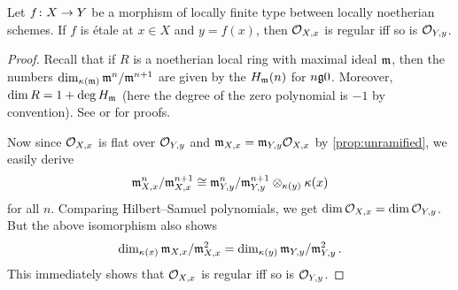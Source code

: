 \begin{prop}\label{prop:etaleRegular}
	Let $f\colon X\morphism Y$ be a morphism of locally finite type between locally noetherian schemes. If $f$ is étale at $x\in X$ and $y=f(x)$, then $\mathcal{O}_{X,x}$ is regular iff so is $\mathcal{O}_{Y,y}$.
\end{prop}
\begin{proof}
	Recall that if $R$ is a noetherian local ring with maximal ideal $\mathfrak{m}$, then the numbers $\dim_{\kappa(\mathfrak{m})}\mathfrak{m}^n/\mathfrak{m}^{n+1}$ are given by the  $H_{\mathfrak{m}}(n)$ for $n\gge 0$. Moreover, $\dim R=1+\deg H_{\mathfrak{m}}$ (here the degree of the zero polynomial is $-1$ by convention). See \cite[Chapter~12]{eisenbudCommAlg} or \cite[Theorem~20]{alg2} for proofs.
	
	Now since $\mathcal{O}_{X,x}$ is flat over $\mathcal{O}_{Y,y}$ and $\mathfrak{m}_{X,x}=\mathfrak{m}_{Y,y}\mathcal{O}_{X,x}$ by \cref{prop:unramified}, we easily derive
	\begin{equation*}
		\mathfrak{m}_{X,x}^n/\mathfrak{m}_{X,x}^{n+1}\cong \mathfrak{m}_{Y,y}^n/\mathfrak{m}_{Y,y}^{n+1}\otimes_{\kappa(y)}\kappa(x)
	\end{equation*}
	for all $n$. Comparing Hilbert--Samuel polynomials, we get $\dim \mathcal{O}_{X,x}=\dim\mathcal{O}_{Y,y}$. But the above isomorphism also shows
	\begin{equation*}
		\dim_{\kappa(x)}\mathfrak{m}_{X,x}/\mathfrak{m}_{X,x}^2=\dim_{\kappa(y)}\mathfrak{m}_{Y,y}/\mathfrak{m}_{Y,y}^2\,.
	\end{equation*}
	This immediately shows that $\mathcal{O}_{X,x}$ is regular iff so is $\mathcal{O}_{Y,y}$.
\end{proof}

